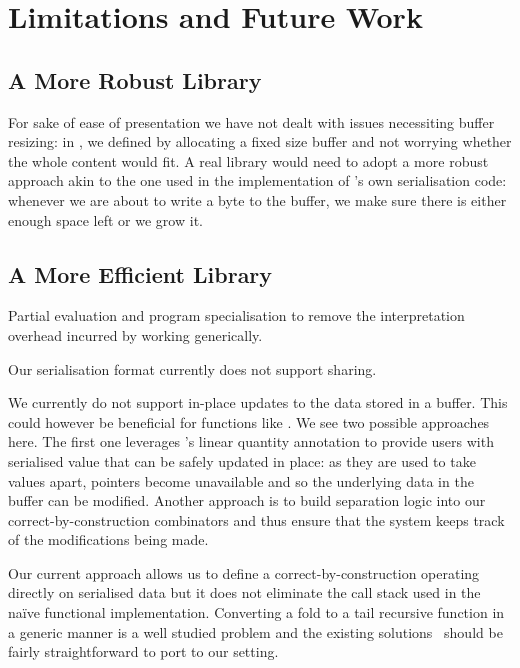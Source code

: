 \section{Limitations and Future Work}

\subsection{A More Robust Library}

For sake of ease of presentation we have not dealt with issues necessiting
buffer resizing: in ,
we defined 
by allocating a fixed size buffer and not worrying whether the whole content
would fit.
%
A real library would need to adopt a more robust approach
akin to the one used in the implementation of \idris{}'s own serialisation
code: whenever we are about to write a byte to the buffer, we make sure there
is either enough space left or we grow it.

\subsection{A More Efficient Library}

Partial evaluation and program specialisation to remove the interpretation
overhead incurred by working generically.

Our serialisation format currently does not support sharing.


We currently do not support in-place updates to the data stored in a buffer.
This could however be beneficial for functions like .
%
We see two possible approaches here. The first one leverages \idris{}'s
linear quantity annotation to provide users with serialised value that
can be safely updated in place: as they are used to take values apart,
pointers become unavailable and so the underlying data in the buffer can
be modified.
%
Another approach is to build separation logic into our correct-by-construction
combinators and thus ensure that the system keeps track of the modifications
being made.



Our current approach allows us to define a correct-by-construction
 operating directly on serialised data but it
does not eliminate the call stack used in the naïve functional
implementation.
%
Converting a fold to a tail recursive function in a generic manner
is a well studied problem and the existing
solutions~\cite{DBLP:conf/popl/McBride08,DBLP:conf/icfp/CortinasS18}
should be fairly straightforward to port to our setting.


